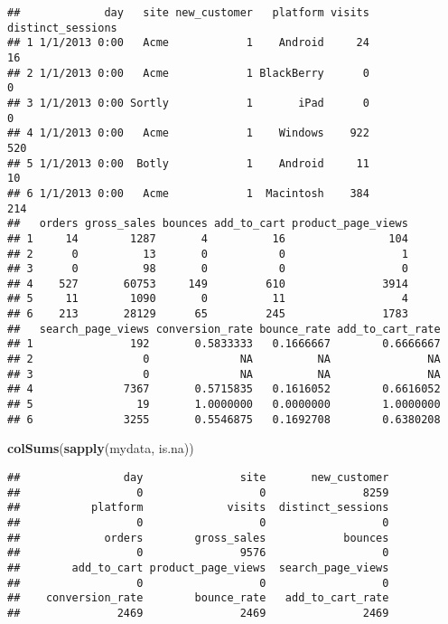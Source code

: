 \documentclass[]{article}
\newenvironment{Shaded}{\begin{snugshade}}{\end{snugshade}}
\newcommand{\KeywordTok}[1]{\textcolor[rgb]{0.13,0.29,0.53}{\textbf{{#1}}}}
\newcommand{\NormalTok}[1]{{#1}}
\begin{document}
\begin{verbatim}
##             day   site new_customer   platform visits distinct_sessions
## 1 1/1/2013 0:00   Acme            1    Android     24                16
## 2 1/1/2013 0:00   Acme            1 BlackBerry      0                 0
## 3 1/1/2013 0:00 Sortly            1       iPad      0                 0
## 4 1/1/2013 0:00   Acme            1    Windows    922               520
## 5 1/1/2013 0:00  Botly            1    Android     11                10
## 6 1/1/2013 0:00   Acme            1  Macintosh    384               214
##   orders gross_sales bounces add_to_cart product_page_views
## 1     14        1287       4          16                104
## 2      0          13       0           0                  1
## 3      0          98       0           0                  0
## 4    527       60753     149         610               3914
## 5     11        1090       0          11                  4
## 6    213       28129      65         245               1783
##   search_page_views conversion_rate bounce_rate add_to_cart_rate
## 1               192       0.5833333   0.1666667        0.6666667
## 2                 0              NA          NA               NA
## 3                 0              NA          NA               NA
## 4              7367       0.5715835   0.1616052        0.6616052
## 5                19       1.0000000   0.0000000        1.0000000
## 6              3255       0.5546875   0.1692708        0.6380208
\end{verbatim}

\begin{Shaded}
\begin{Highlighting}[]
\KeywordTok{colSums}\NormalTok{(}\KeywordTok{sapply}\NormalTok{(mydata, is.na))}
\end{Highlighting}
\end{Shaded}

\begin{verbatim}
##                day               site       new_customer 
##                  0                  0               8259 
##           platform             visits  distinct_sessions 
##                  0                  0                  0 
##             orders        gross_sales            bounces 
##                  0               9576                  0 
##        add_to_cart product_page_views  search_page_views 
##                  0                  0                  0 
##    conversion_rate        bounce_rate   add_to_cart_rate 
##               2469               2469               2469
\end{verbatim}
\end{document}
